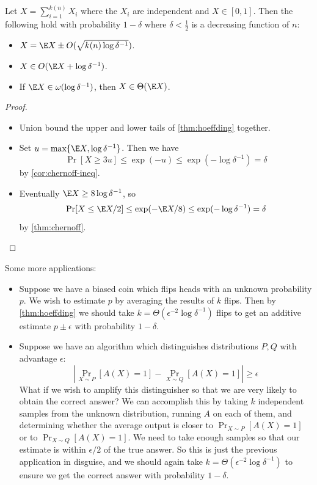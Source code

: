 \documentclass[11pt,a4paper]{article}
\begin{document}
\begin{tcolorbox}
  \begin{lemma}
    Let \(X = \sum_{i=1}^{k(n)} X_i\) where the \(X_i\) are independent and \(X \in [0, 1]\).  Then the following hold with probability $1 - \delta$ where $\delta < \frac12$ is a decreasing function of $n$:
    \begin{itemize}
    \item $X = \E X \pm O(\sqrt{k(n) \log \delta^{-1}})$.
    \item $X \in O(\E X + \log \delta^{-1})$.
    \item If $\E X \in \omega(\log \delta^{-1})$, then $X \in \Theta(\E X)$.
    \end{itemize}
  \end{lemma}
\end{tcolorbox}
\begin{proof}\hfill
  \begin{itemize}
  \item
    Union bound the upper and lower tails of \cref{thm:hoeffding} together.
  \item
    Set $u = \max\{\E X, \log \delta^{-1}\}$.
    Then we have
    \[\Pr[X \ge 3u] \le \exp(-u) \le \exp(-\log \delta^{-1}) = \delta\]
    by \cref{cor:chernoff-ineq}.
  \item
    Eventually $\E X \ge 8 \log \delta^{-1}$, so
    \[\Pr[X \le \E X / 2] \le \exp(-\E X / 8) \le \exp(-\log \delta^{-1}) = \delta\]
    by \cref{thm:chernoff}.
  \end{itemize}
\end{proof}

Some more applications:

\begin{itemize}
\item
  Suppose we have a biased coin which flips heads with an unknown probability $p$.
  We wish to estimate $p$ by averaging the results of $k$ flips.
  Then by \cref{thm:hoeffding} we should take $k = \Theta(\epsilon^{-2} \log \delta^{-1})$ flips
  to get an additive estimate $p \pm \epsilon$ with probability $1 - \delta$.
\item
  Suppose we have an algorithm which distinguishes distributions $P, Q$ with advantage $\epsilon$:
  \[
  \left|\Pr_{X \sim P}[A(X) = 1] - \Pr_{X \sim Q}[A(X) = 1]\right| \ge \epsilon
  \]
  What if we wish to amplify this distinguisher so that we are very likely to obtain the correct answer?
  We can accomplish this by taking $k$ independent samples from the unknown distribution,
  running $A$ on each of them, and determining whether the average output is closer to $\Pr_{X \sim P}[A(X) = 1]$ or to $\Pr_{X \sim Q}[A(X) = 1]$.
  We need to take enough samples so that our estimate is within $\epsilon/2$ of the true answer.
  So this is just the previous application in disguise, and we should again take $k = \Theta(\epsilon^{-2} \log \delta^{-1})$
  to ensure we get the correct answer with probability $1 - \delta$.
\end{itemize}
\end{document}
